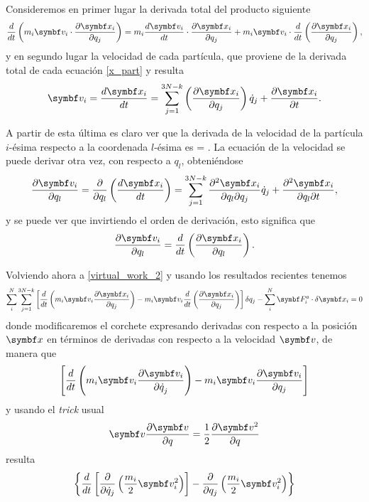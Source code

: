 \documentclass[10pt,oneside]{CBFT_book}
\begin{document}
Consideremos en primer lugar la derivada total del producto siguiente
\[
	\frac{d}{dt}\left( m_i\vb{v}_i \cdot \dpar{\vb{x}_i}{q_j} \right) =
	m_i \dtot{\vb{v}_i}{t} \cdot \dpar{\vb{x}_i}{q_j} + m_i \vb{v}_i 
	\cdot \frac{d}{dt}\left(\dpar{\vb{x}_i}{q_j}\right),
\]
y en segundo lugar la velocidad de cada partícula, que proviene de la derivada total de cada ecuación 
\eqref{x_part} y resulta
\[
	\vb{v}_i = \dtot{\vb{x}_i}{t} = \sum_{j=1}^{3N-k} \left( \dpar{\vb{x}_i}{q_j} \right)
	\dot{q}_j + \dpar{\vb{x}_i}{t}.
\]

A partir de esta última es claro ver que la derivada de la velocidad de la partícula $i$-ésima respecto a la coordenada 
$l$-ésima es
\be
	 = .
	\label{relacion_derivadas}
\ee
{}
La ecuación de la velocidad se puede derivar otra vez, con respecto a $q_l$, obteniéndose
\[
	\dpar{\vb{v}_i}{q_l} = \frac{\partial}{\partial q_l} \left( \dtot{\vb{x}_i}{t} \right) =
	\sum_{j=1}^{3N-k} \dparcru{\vb{x}_i}{q_j}{q_l} \dot{q}_j + 
	\dparcru{\vb{x}_i}{t}{q_l},
\]
y se puede ver que invirtiendo el orden de derivación, esto significa que 
\[
	\dpar{\vb{v}_i}{q_l} = \frac{d}{dt} \left( \dpar{\vb{x}_i}{q_l} \right).
\]

% 

Volviendo ahora a \eqref{virtual_work_2} y usando los resultados recientes tenemos
\[
	\sum_i^N \sum_{j=1}^{3N-k} 
	\left[ \frac{d}{dt} \left( m_i \vb{v}_i \dpar{\vb{x}_i}{q_j} \right) - 
	m_i \vb{v}_i \frac{d}{dt}\left( \dpar{\vb{x}_i}{q_j} \right) \right] \delta q_j
	- \sum_i^N  \vb{F}_i^a \cdot \delta \vb{x}_i = 0
\]
donde modificaremos el corchete expresando derivadas con respecto a la posición $\vb{x}$ en términos
de derivadas con respecto a la velocidad $\vb{v}$, de manera que 
\[
	\left[ \frac{d}{dt} \left( m_i \vb{v}_i \dpar{\vb{v}_i}{\dot{q}_j} \right) -
	m_i \vb{v}_i \dpar{\vb{v}_i}{q_j} \right]
\]
y usando el {\it trick} usual
\[
	\vb{v} \dpar{\vb{v}}{q} = \frac{1}{2} \dpar{ \vb{v}^2 }{q} 
\]
resulta
\[
	\left\{ 
	\frac{d}{dt} \left[ \frac{\partial}{\partial \dot{q}_j} \left( \frac{m_i}{2} \vb{v}_i^2 \right) \right] - 
	\frac{\partial}{\partial q_j} \left( \frac{m_i}{2} \vb{v}_i^2 \right) \right\}
\]
\end{document}
